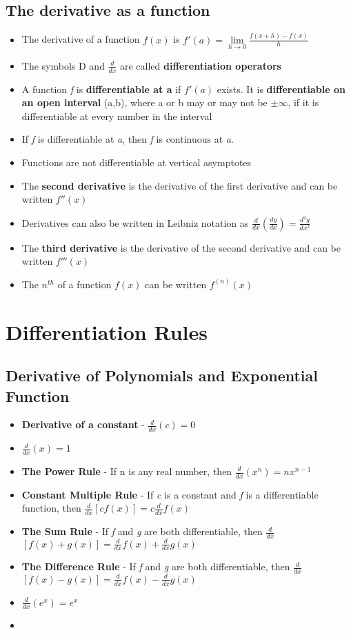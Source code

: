 \documentclass{report}
\newcommand{\ddx}{$\frac{d}{dx}$}
\begin{document}
		\section{The derivative as a function}
			\begin{itemize}\addtolength{\leftskip}{2em}
				\item The derivative of a function $f(x)$ is $f'(a)=\lim\limits_{h\rightarrow 0}\frac{f(x+h)-f(x)}{h}$
				\item The symbols D and $\frac{d}{dx}$ are called \textbf{differentiation operators}
				\item A function \textit{f} is \textbf{differentiable at a} if $f'(a)$ exists. It is \textbf{differentiable on an open interval} (a,b), where a or b may or may not be $\pm \infty$, if it is differentiable at every number in the interval 
				\item If \textit{f} is differentiable at \textit{a}, then \textit{f} is continuous at \textit{a}.
				\item Functions are not differentiable at vertical asymptotes 
				\item The \textbf{second derivative} is the derivative of the first derivative and can be written $f''(x)$
				\item Derivatives can also be written in Leibniz notation as $\frac{d}{dx}(\frac{dy}{dx})=\frac{d^2y}{dx^2}$
				\item The \textbf{third derivative} is the derivative of the second derivative and can be written $f'''(x)$
				\item The $n^{th}$ of a function $f(x)$ can be written $f^(n)(x)$ 
				
			\end{itemize}
\chapter{Differentiation Rules}
		\section{Derivative of Polynomials and Exponential Function}
			\begin{itemize}\addtolength{\leftskip}{2em}
				\item \textbf{Derivative of a constant} - $\frac{d}{dx}(c)=0$
				\item $\frac{d}{dx}(x)=1$
				\item \textbf{The Power Rule} - If n is any real number, then $\frac{d}{dx}(x^n)=nx^{n-1}$
				\item \textbf{Constant Multiple Rule} - If \textit{c} is a constant and \textit{f} is a differentiable function, then {\ddx}$[cf(x)]=c${\ddx}$f(x)$
				\item \textbf{The Sum Rule} - If \textit{f} and \textit{g} are both differentiable, then \ddx$[f(x)+g(x)]=$\ddx $f(x)+$\ddx$ g(x)$
				\item \textbf{The Difference Rule} - If \textit{f} and \textit{g} are both differentiable, then \ddx$[f(x)-g(x)]=$\ddx $f(x)-$\ddx$ g(x)$
				\item {\ddx}$(e^x)=e^x$
				\item 
			\end{itemize}
\end{document}
